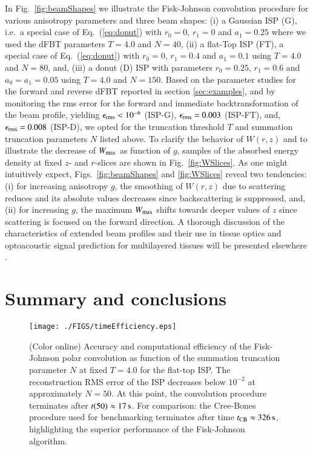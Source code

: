 \documentclass[review]{elsarticle}
\begin{document}
In Fig.~\ref{fig:beamShapes} we illustrate the Fisk-Johnson convolution
procedure for various anisotropy parameters and three beam shapes:
(i) a Gaussian ISP (G), i.e.\ a special case of Eq.~(\ref{eq:donut}) with
$r_0=0$, $r_1=0$ and $a_1=0.25$ where we used the dFBT parameters $T=4.0$ 
and $N=40$,
(ii) a flat-Top ISP (FT), a special 
case of Eq.~(\ref{eq:donut}) with $r_0=0$, $r_1=0.4$ and $a_1=0.1$ using 
$T=4.0$ and $N=80$,
and,
(iii) a donut (D) ISP with parameters $r_0=0.25$, $r_1=0.6$ and $a_0=a_1=0.05$ 
using $T=4.0$ and $N=150$.
Based on the parameter studies for the forward and reverse dFBT reported in
section \ref{sec:examples}, and by monitoring the rms error for the forward and
immediate backtransformation of the beam profile, yielding $\epsilon_{\rm
rms}<10^{-6}$ (ISP-G), $\epsilon_{\rm rms}=0.003$ (ISP-FT), and, $\epsilon_{\rm
rms}=0.008$ (ISP-D), we opted for the truncation threshold $T$ and summation
truncation parameters $N$ listed above. 
To clarify the behavior of $W(r,z)$ and to illustrate the decrease of $W_{\rm
max}$ as function of $g$, samples of the absorbed energy density at fixed $z$-
and $r$-slices are shown in Fig.~\ref{fig:WSlices}. As one might intuitively
expect, Figs.~\ref{fig:beamShapes} and \ref{fig:WSlices} reveal two tendencies:
(i) for increasing anisotropy $g$, the smoothing of $W(r,z)$ due to scattering
reduces and its absolute values decreases since backscattering is suppressed, 
and, (ii) for increasing $g$, the maximum $W_{\rm max}$ shifts towards deeper 
values of $z$ since scattering is focused on the forward direction.
  A thorough discussion of the characteristics of extended beam profiles and
their use in tissue optics and optoacoustic signal prediction for multilayered
tissues will be presented elsewhere \cite{MelchertOA:2016}.


\section{Summary and conclusions}
\label{sec:fin}

%
%
\begin{figure}[t!]
\centerline{\texttt{[image: ./FIGS/timeEfficiency.eps]} } 
\caption{(Color online) Accuracy and computational efficiency of the Fisk-Johnson
polar convolution as function of the summation truncation parameter $N$ at
fixed $T=4.0$ for the flat-top ISP. The reconstruction RMS error of the ISP
decreases below $10^{-2}$ at approximately $N=50$. At this point, the 
convolution procedure terminates after $t(50)\approx 17\,{\rm{s}}$. For 
comparison: the Cree-Bones procedure used for benchmarking terminates after
time $t_{\rm{CB}}\approx 326\,{\rm{s}}$, highlighting the superior performance 
of the Fisk-Johnson algorithm.
}
\label{fig:timeEfficiency}
\end{figure}
\end{document}
